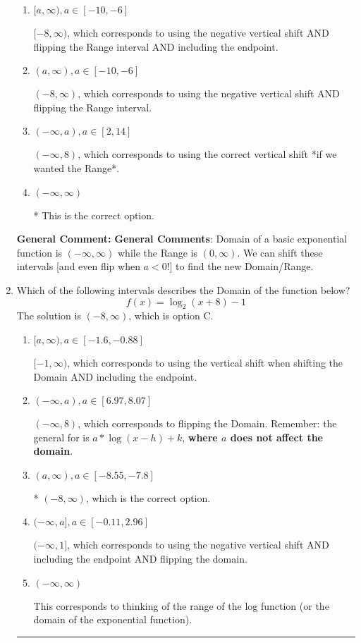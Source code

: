 \documentclass{extbook}[14pt]
\newcommand{\litem}[1]{\item #1

\rule{\textwidth}{0.4pt}}
\begin{document}
\begin{enumerate}
{\begin{enumerate}[label=\Alph*.]
$(-\infty, 8]$, which corresponds to using the correct vertical shift *if we wanted the Range* AND including the endpoint.
\item \( [a, \infty), a \in [-10, -6] \)

$[-8, \infty)$, which corresponds to using the negative vertical shift AND flipping the Range interval AND including the endpoint.
\item \( (a, \infty), a \in [-10, -6] \)

$(-8, \infty)$, which corresponds to using the negative vertical shift AND flipping the Range interval.
\item \( (-\infty, a), a \in [2, 14] \)

$(-\infty, 8)$, which corresponds to using the correct vertical shift *if we wanted the Range*.
\item \( (-\infty, \infty) \)

* This is the correct option.
\end{enumerate}

\textbf{General Comment:} \textbf{General Comments}: Domain of a basic exponential function is $(-\infty, \infty)$ while the Range is $(0, \infty)$. We can shift these intervals [and even flip when $a<0$!] to find the new Domain/Range.
}
\litem{
Which of the following intervals describes the Domain of the function below?
\[ f(x) = \log_2{(x+8)}-1 \]
The solution is \( (-8, \infty) \), which is option C.\begin{enumerate}[label=\Alph*.]
\item \( [a, \infty), a \in [-1.6, -0.88] \)

$[-1, \infty)$, which corresponds to using the vertical shift when shifting the Domain AND including the endpoint.
\item \( (-\infty, a), a \in [6.97, 8.07] \)

$(-\infty, 8)$, which corresponds to flipping the Domain. Remember: the general for is $a*\log(x-h)+k$, \textbf{where $a$ does not affect the domain}.
\item \( (a, \infty), a \in [-8.55, -7.8] \)

* $(-8, \infty)$, which is the correct option.
\item \( (-\infty, a], a \in [-0.11, 2.96] \)

$(-\infty, 1]$, which corresponds to using the negative vertical shift AND including the endpoint AND flipping the domain.
\item \( (-\infty, \infty) \)

This corresponds to thinking of the range of the log function (or the domain of the exponential function).
\end{enumerate}

}
\end{enumerate}
\end{document}
